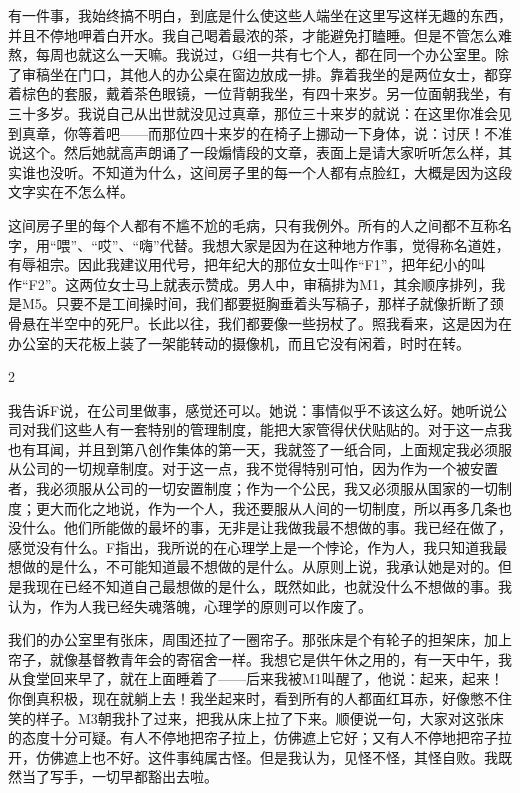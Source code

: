 有一件事，我始终搞不明白，到底是什么使这些人端坐在这里写这样无趣的东西，并且不停地呷着白开水。我自己喝着最浓的茶，才能避免打瞌睡。但是不管怎么难熬，每周也就这么一天嘛。我说过，G组一共有七个人，都在同一个办公室里。除了审稿坐在门口，其他人的办公桌在窗边放成一排。靠着我坐的是两位女士，都穿着棕色的套服，戴着茶色眼镜，一位背朝我坐，有四十来岁。另一位面朝我坐，有三十多岁。我说自己从出世就没见过真章，那位三十来岁的就说：在这里你准会见到真章，你等着吧——而那位四十来岁的在椅子上挪动一下身体，说：讨厌！不准说这个。然后她就高声朗诵了一段煽情段的文章，表面上是请大家听听怎么样，其实谁也没听。不知道为什么，这间房子里的每一个人都有点脸红，大概是因为这段文字实在不怎么样。 

这间房子里的每个人都有不尴不尬的毛病，只有我例外。所有的人之间都不互称名字，用“喂”、“哎”、“嗨”代替。我想大家是因为在这种地方作事，觉得称名道姓，有辱祖宗。因此我建议用代号，把年纪大的那位女士叫作“F1”，把年纪小的叫作“F2”。这两位女士马上就表示赞成。男人中，审稿排为M1，其余顺序排列，我是M5。只要不是工间操时间，我们都要挺胸垂着头写稿子，那样子就像折断了颈骨悬在半空中的死尸。长此以往，我们都要像一些拐杖了。照我看来，这是因为在办公室的天花板上装了一架能转动的摄像机，而且它没有闲着，时时在转。 

2 

我告诉F说，在公司里做事，感觉还可以。她说：事情似乎不该这么好。她听说公司对我们这些人有一套特别的管理制度，能把大家管得伏伏贴贴的。对于这一点我也有耳闻，并且到第八创作集体的第一天，我就签了一纸合同，上面规定我必须服从公司的一切规章制度。对于这一点，我不觉得特别可怕，因为作为一个被安置者，我必须服从公司的一切安置制度；作为一个公民，我又必须服从国家的一切制度；更大而化之地说，作为一个人，我还要服从人间的一切制度，所以再多几条也没什么。他们所能做的最坏的事，无非是让我做我最不想做的事。我已经在做了，感觉没有什么。F指出，我所说的在心理学上是一个悖论，作为人，我只知道我最想做的是什么，不可能知道最不想做的是什么。从原则上说，我承认她是对的。但是我现在已经不知道自己最想做的是什么，既然如此，也就没什么不想做的事。我认为，作为人我已经失魂落魄，心理学的原则可以作废了。 

我们的办公室里有张床，周围还拉了一圈帘子。那张床是个有轮子的担架床，加上帘子，就像基督教青年会的寄宿舍一样。我想它是供午休之用的，有一天中午，我从食堂回来早了，就在上面睡着了——后来我被M1叫醒了，他说：起来，起来！你倒真积极，现在就躺上去！我坐起来时，看到所有的人都面红耳赤，好像憋不住笑的样子。M3朝我扑了过来，把我从床上拉了下来。顺便说一句，大家对这张床的态度十分可疑。有人不停地把帘子拉上，仿佛遮上它好；又有人不停地把帘子拉开，仿佛遮上也不好。这件事纯属古怪。但是我认为，见怪不怪，其怪自败。我既然当了写手，一切早都豁出去啦。 

